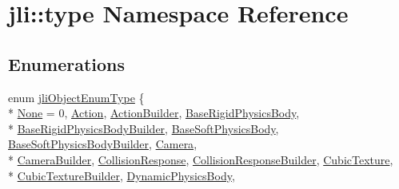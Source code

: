 \hypertarget{namespacejli_1_1type}{\section{jli\+:\+:type Namespace Reference}
\label{namespacejli_1_1type}
}
\subsection*{Enumerations}
\begin{DoxyCompactItemize}
\item 
enum \hyperlink{namespacejli_1_1type_a902d3ca40483b7825e5d9d0d81d6d69b}{jli\+Object\+Enum\+Type} \{ \\*
\hyperlink{namespacejli_1_1type_a902d3ca40483b7825e5d9d0d81d6d69bae6c48303b9c692c5173e55a981110620}{None} = 0, 
\hyperlink{namespacejli_1_1type_a902d3ca40483b7825e5d9d0d81d6d69ba26652d2358f64bfeacbd28d45b04de9b}{Action}, 
\hyperlink{namespacejli_1_1type_a902d3ca40483b7825e5d9d0d81d6d69ba2b9f17bb6f62d75478917c6ca069ce57}{Action\+Builder}, 
\hyperlink{namespacejli_1_1type_a902d3ca40483b7825e5d9d0d81d6d69ba6102841e093bd178e9813cb0c4f7b1f3}{Base\+Rigid\+Physics\+Body}, 
\\*
\hyperlink{namespacejli_1_1type_a902d3ca40483b7825e5d9d0d81d6d69ba2f2165932a26418fd59ea6c7bc89e964}{Base\+Rigid\+Physics\+Body\+Builder}, 
\hyperlink{namespacejli_1_1type_a902d3ca40483b7825e5d9d0d81d6d69ba96c878bbb211efa31e570af74887ca0d}{Base\+Soft\+Physics\+Body}, 
\hyperlink{namespacejli_1_1type_a902d3ca40483b7825e5d9d0d81d6d69ba94003630971b59cc9ad1b1b415625c89}{Base\+Soft\+Physics\+Body\+Builder}, 
\hyperlink{namespacejli_1_1type_a902d3ca40483b7825e5d9d0d81d6d69ba6fa39e52b482b8761e10ba24d2870b68}{Camera}, 
\\*
\hyperlink{namespacejli_1_1type_a902d3ca40483b7825e5d9d0d81d6d69ba02043d3bb24513a0c0f29b5d83a1f8b2}{Camera\+Builder}, 
\hyperlink{namespacejli_1_1type_a902d3ca40483b7825e5d9d0d81d6d69ba5f948ce9d42d78bd85320246c82c3225}{Collision\+Response}, 
\hyperlink{namespacejli_1_1type_a902d3ca40483b7825e5d9d0d81d6d69ba7e54ce68e7f8608dedaa8f3dec0987ca}{Collision\+Response\+Builder}, 
\hyperlink{namespacejli_1_1type_a902d3ca40483b7825e5d9d0d81d6d69bada26095235773e5689c2f2e4741c8f2a}{Cubic\+Texture}, 
\\*
\hyperlink{namespacejli_1_1type_a902d3ca40483b7825e5d9d0d81d6d69ba8ebec8a816c4aafe8cdb6cd9bfcc5614}{Cubic\+Texture\+Builder}, 
\hyperlink{namespacejli_1_1type_a902d3ca40483b7825e5d9d0d81d6d69ba22fa77c73477d9c55163e5fd4927dd01}{Dynamic\+Physics\+Body}, 

\end{DoxyCompactItemize}

